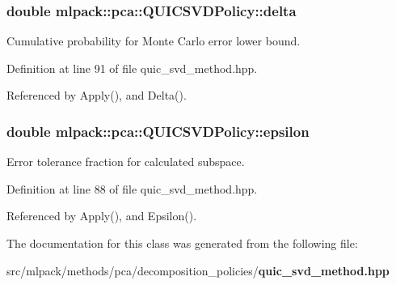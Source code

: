 \subsubsection[{delta}]{\setlength{\rightskip}{0pt plus 5cm}double mlpack\+::pca\+::\+Q\+U\+I\+C\+S\+V\+D\+Policy\+::delta\hspace{0.3cm}{\ttfamily [private]}}\label{classmlpack_1_1pca_1_1QUICSVDPolicy_a67f8f2736545586e1a5175654e433cc0}


Cumulative probability for Monte Carlo error lower bound. 



Definition at line 91 of file quic\+\_\+svd\+\_\+method.\+hpp.



Referenced by Apply(), and Delta().

\subsubsection[{epsilon}]{\setlength{\rightskip}{0pt plus 5cm}double mlpack\+::pca\+::\+Q\+U\+I\+C\+S\+V\+D\+Policy\+::epsilon\hspace{0.3cm}{\ttfamily [private]}}\label{classmlpack_1_1pca_1_1QUICSVDPolicy_ade9427e54e84eec100874782a52d7a10}


Error tolerance fraction for calculated subspace. 



Definition at line 88 of file quic\+\_\+svd\+\_\+method.\+hpp.



Referenced by Apply(), and Epsilon().



The documentation for this class was generated from the following file\+:\begin{DoxyCompactItemize}
\item 
src/mlpack/methods/pca/decomposition\+\_\+policies/{\bf quic\+\_\+svd\+\_\+method.\+hpp}\end{DoxyCompactItemize}
